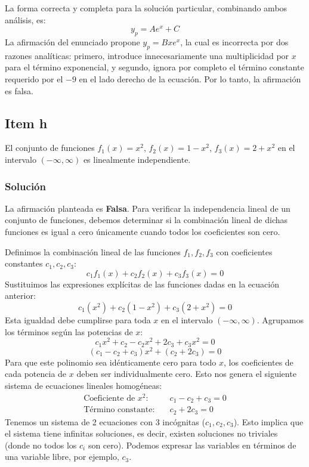 \documentclass[a4paper]{article}
\begin{document}
La forma correcta y completa para la solución particular, combinando ambos análisis, es:
$$
y_p = A e^x + C
$$
La afirmación del enunciado propone $y_p = Bxe^x$, la cual es incorrecta por dos razones analíticas: primero, introduce innecesariamente una multiplicidad por $x$ para el término exponencial, y segundo, ignora por completo el término constante requerido por el $-9$ en el lado derecho de la ecuación. Por lo tanto, la afirmación es falsa.

\subsection{Item h}
El conjunto de funciones $f_1(x)= x^2$, $f_2(x)= 1 - x^2$, $f_3(x)= 2 + x^2$ en el intervalo $(-\infty, \infty)$ es linealmente independiente.

\subsubsection{Solución}
La afirmación planteada es \textbf{Falsa}. Para verificar la independencia lineal de un conjunto de funciones, debemos determinar si la combinación lineal de dichas funciones es igual a cero únicamente cuando todos los coeficientes son cero.

Definimos la combinación lineal de las funciones $f_1, f_2, f_3$ con coeficientes constantes $c_1, c_2, c_3$:
$$
c_1 f_1(x) + c_2 f_2(x) + c_3 f_3(x) = 0
$$
Sustituimos las expresiones explícitas de las funciones dadas en la ecuación anterior:
$$
c_1 (x^2) + c_2 (1 - x^2) + c_3 (2 + x^2) = 0
$$
Esta igualdad debe cumplirse para toda $x$ en el intervalo $(-\infty, \infty)$. Agrupamos los términos según las potencias de $x$:
$$
c_1 x^2 + c_2 - c_2 x^2 + 2c_3 + c_3 x^2 = 0
$$
$$
(c_1 - c_2 + c_3)x^2 + (c_2 + 2c_3) = 0
$$
Para que este polinomio sea idénticamente cero para todo $x$, los coeficientes de cada potencia de $x$ deben ser individualmente cero. Esto nos genera el siguiente sistema de ecuaciones lineales homogéneas:
\begin{align*}
\text{Coeficiente de } x^2: & \quad c_1 - c_2 + c_3 = 0 \\
\text{Término constante}: & \quad c_2 + 2c_3 = 0
\end{align*}
Tenemos un sistema de 2 ecuaciones con 3 incógnitas ($c_1, c_2, c_3$). Esto implica que el sistema tiene infinitas soluciones, es decir, existen soluciones no triviales (donde no todos los $c_i$ son cero). Podemos expresar las variables en términos de una variable libre, por ejemplo, $c_3$.
\end{document}
